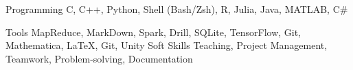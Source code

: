 

\begin{cvskills}

  \cvskill
    {Programming} %
    {C, C++, Python, Shell (Bash/Zsh), R, Julia, Java, MATLAB, C\#} %

  \cvskill
    {Tools} %
    {MapReduce, MarkDown, Spark, Drill, SQLite, TensorFlow, Git, Mathematica, \LaTeX, Git, Unity} %
  \cvskill
    {Soft Skills} %
    {Teaching, Project Management, Teamwork, Problem-solving, Documentation} %

\end{cvskills}
